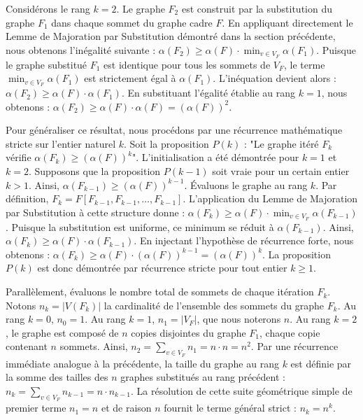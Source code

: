 \documentclass[11pt, a4paper]{article}
\begin{document}
Considérons le rang $k=2$. Le graphe $F_2$ est construit par la substitution du graphe $F_1$ dans chaque sommet du graphe cadre $F$.
En appliquant directement le Lemme de Majoration par Substitution démontré dans la section précédente, nous obtenons l'inégalité suivante :
$\alpha(F_2) \ge \alpha(F) \cdot \min_{v \in V_F} \alpha(F_1)$.
Puisque le graphe substitué $F_1$ est identique pour tous les sommets de $V_F$, le terme $\min_{v \in V_F} \alpha(F_1)$ est strictement égal à $\alpha(F_1)$.
L'inéquation devient alors :
$\alpha(F_2) \ge \alpha(F) \cdot \alpha(F_1)$.
En substituant l'égalité établie au rang $k=1$, nous obtenons :
$\alpha(F_2) \ge \alpha(F) \cdot \alpha(F) = (\alpha(F))^2$.

Pour généraliser ce résultat, nous procédons par une récurrence mathématique stricte sur l'entier naturel $k$.
Soit la proposition $P(k)$ : "Le graphe itéré $F_k$ vérifie $\alpha(F_k) \ge (\alpha(F))^k$".
L'initialisation a été démontrée pour $k=1$ et $k=2$.
Supposons que la proposition $P(k-1)$ soit vraie pour un certain entier $k > 1$. Ainsi, $\alpha(F_{k-1}) \ge (\alpha(F))^{k-1}$.
Évaluons le graphe au rang $k$. Par définition, $F_k = F[F_{k-1}, F_{k-1}, \dots, F_{k-1}]$.
L'application du Lemme de Majoration par Substitution à cette structure donne :
$\alpha(F_k) \ge \alpha(F) \cdot \min_{v \in V_F} \alpha(F_{k-1})$.
Puisque la substitution est uniforme, ce minimum se réduit à $\alpha(F_{k-1})$.
Ainsi, $\alpha(F_k) \ge \alpha(F) \cdot \alpha(F_{k-1})$.
En injectant l'hypothèse de récurrence forte, nous obtenons :
$\alpha(F_k) \ge \alpha(F) \cdot (\alpha(F))^{k-1} = (\alpha(F))^k$.
La proposition $P(k)$ est donc démontrée par récurrence stricte pour tout entier $k \ge 1$.

Parallèlement, évaluons le nombre total de sommets de chaque itération $F_k$.
Notons $n_k = |V(F_k)|$ la cardinalité de l'ensemble des sommets du graphe $F_k$.
Au rang $k=0$, $n_0 = 1$.
Au rang $k=1$, $n_1 = |V_F|$, que nous noterons $n$.
Au rang $k=2$, le graphe est composé de $n$ copies disjointes du graphe $F_1$, chaque copie contenant $n$ sommets. Ainsi, $n_2 = \sum_{v \in V_F} n_1 = n \cdot n = n^2$.
Par une récurrence immédiate analogue à la précédente, la taille du graphe au rang $k$ est définie par la somme des tailles des $n$ graphes substitués au rang précédent :
$n_k = \sum_{v \in V_F} n_{k-1} = n \cdot n_{k-1}$.
La résolution de cette suite géométrique simple de premier terme $n_1 = n$ et de raison $n$ fournit le terme général strict :
$n_k = n^k$.
\end{document}
